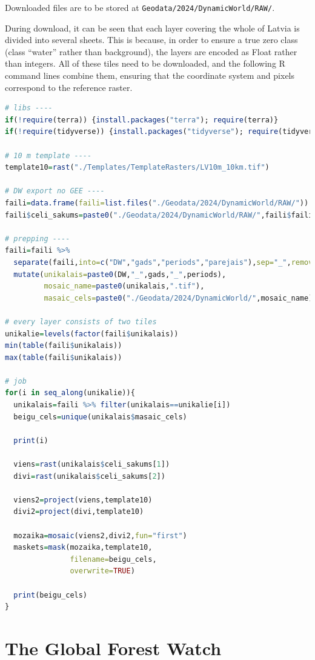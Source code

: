 \documentclass[
]{book}
\newcommand{\passthrough}[1]{#1}
\begin{document}
Downloaded files are to be stored at \passthrough{\lstinline!Geodata/2024/DynamicWorld/RAW/!}.

During download, it can be seen that each layer covering the whole of Latvia is
divided into several sheets. This is because, in order to ensure a true zero
class (class ``water'' rather than background), the layers are encoded as Float
rather than integers. All of these tiles need to be downloaded, and the following
R command lines combine them, ensuring that the coordinate system and pixels
correspond to the reference raster.

\begin{lstlisting}[language=R]
# libs ----
if(!require(terra)) {install.packages("terra"); require(terra)}
if(!require(tidyverse)) {install.packages("tidyverse"); require(tidyverse)}

# 10 m template ----
template10=rast("./Templates/TemplateRasters/LV10m_10km.tif")

# DW export no GEE ----
faili=data.frame(faili=list.files("./Geodata/2024/DynamicWorld/RAW/"))
faili$celi_sakums=paste0("./Geodata/2024/DynamicWorld/RAW/",faili$faili)

# prepping ----
faili=faili %>% 
  separate(faili,into=c("DW","gads","periods","parejais"),sep="_",remove = FALSE) %>% 
  mutate(unikalais=paste0(DW,"_",gads,"_",periods),
         mosaic_name=paste0(unikalais,".tif"),
         masaic_cels=paste0("./Geodata/2024/DynamicWorld/",mosaic_name))

# every layer consists of two tiles
unikalie=levels(factor(faili$unikalais))
min(table(faili$unikalais))
max(table(faili$unikalais))

# job
for(i in seq_along(unikalie)){
  unikalais=faili %>% filter(unikalais==unikalie[i])
  beigu_cels=unique(unikalais$masaic_cels)
  
  print(i)
  
  viens=rast(unikalais$celi_sakums[1])
  divi=rast(unikalais$celi_sakums[2])
  
  viens2=project(viens,template10)
  divi2=project(divi,template10)
  
  mozaika=mosaic(viens2,divi2,fun="first")
  maskets=mask(mozaika,template10,
               filename=beigu_cels,
               overwrite=TRUE)
  
  print(beigu_cels)
}
\end{lstlisting}

\section{The Global Forest Watch}\label{Ch04.09}
\end{document}
